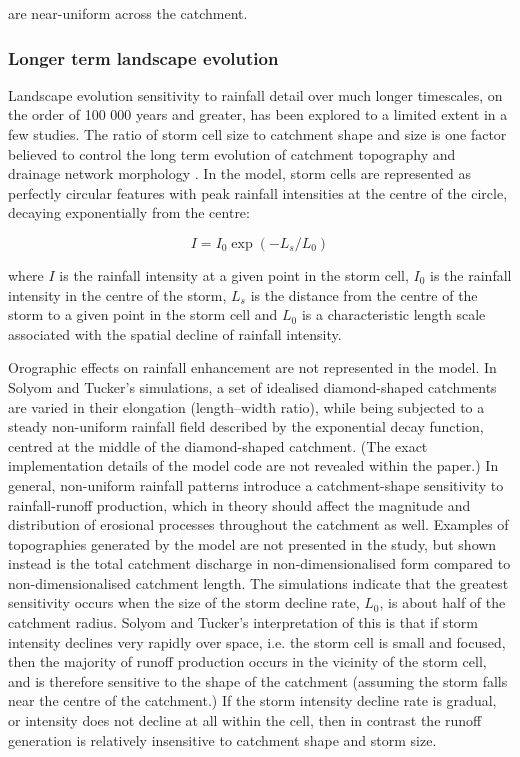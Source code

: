 are near-uniform across the catchment.

\subsubsection{Longer term landscape evolution}

Landscape evolution sensitivity to rainfall detail over much longer timescales, on the order of 100 000 years and greater, has been explored to a limited extent in a few studies. The ratio of storm cell size to catchment shape and size is one factor believed to control the long term evolution of catchment topography and drainage network morphology \citep{solyom2007importance}. In the \citet{solyom2007importance} model, storm cells are represented as perfectly circular features with peak rainfall intensities at the centre of the circle, decaying exponentially from the centre:

\begin{equation}
I = I_0 \exp(-L_s/L_0)
\end{equation}

\noindent
where \(I\) is the rainfall intensity at a given point in the storm cell, \(I_0\) is the rainfall intensity in the centre of the storm, \(L_s\) is the distance from the centre of the storm to a given point in the storm cell and \(L_0\) is a characteristic length scale associated with the spatial decline of rainfall intensity.

Orographic effects on rainfall enhancement are not represented in the model. In Solyom and Tucker's simulations, a set of idealised diamond-shaped catchments are varied in their elongation (length--width ratio), while being subjected to a steady non-uniform rainfall field described by the exponential decay function, centred at the middle of the diamond-shaped catchment. (The exact implementation details of the model code are not revealed within the paper.) In general, non-uniform rainfall patterns introduce a catchment-shape sensitivity to rainfall-runoff production, which in theory should affect the magnitude and distribution of erosional processes throughout the catchment as well. Examples of topographies generated by the model are not presented in the study, but shown instead is the total catchment discharge in non-dimensionalised form compared to non-dimensionalised catchment length. The simulations indicate that the greatest sensitivity occurs when the size of the storm decline rate, \(L_0\), is about half of the catchment radius. Solyom and Tucker's interpretation of this is that if storm intensity declines very rapidly over space, i.e. the storm cell is small and focused, then the majority of runoff production occurs in the vicinity of the storm cell, and is therefore sensitive to the shape of the catchment (assuming the storm falls near the centre of the catchment.) If the storm intensity decline rate is gradual, or intensity does not decline at all within the cell, then in contrast the runoff generation is relatively insensitive to catchment shape and storm size.


